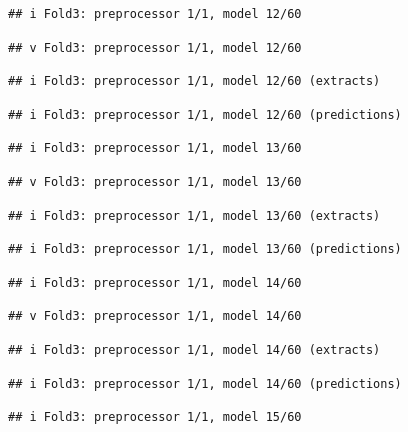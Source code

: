 \documentclass[
]{article}
\begin{document}
\begin{verbatim}
## i Fold3: preprocessor 1/1, model 12/60
\end{verbatim}

\begin{verbatim}
## v Fold3: preprocessor 1/1, model 12/60
\end{verbatim}

\begin{verbatim}
## i Fold3: preprocessor 1/1, model 12/60 (extracts)
\end{verbatim}

\begin{verbatim}
## i Fold3: preprocessor 1/1, model 12/60 (predictions)
\end{verbatim}

\begin{verbatim}
## i Fold3: preprocessor 1/1, model 13/60
\end{verbatim}

\begin{verbatim}
## v Fold3: preprocessor 1/1, model 13/60
\end{verbatim}

\begin{verbatim}
## i Fold3: preprocessor 1/1, model 13/60 (extracts)
\end{verbatim}

\begin{verbatim}
## i Fold3: preprocessor 1/1, model 13/60 (predictions)
\end{verbatim}

\begin{verbatim}
## i Fold3: preprocessor 1/1, model 14/60
\end{verbatim}

\begin{verbatim}
## v Fold3: preprocessor 1/1, model 14/60
\end{verbatim}

\begin{verbatim}
## i Fold3: preprocessor 1/1, model 14/60 (extracts)
\end{verbatim}

\begin{verbatim}
## i Fold3: preprocessor 1/1, model 14/60 (predictions)
\end{verbatim}

\begin{verbatim}
## i Fold3: preprocessor 1/1, model 15/60
\end{verbatim}
\end{document}
